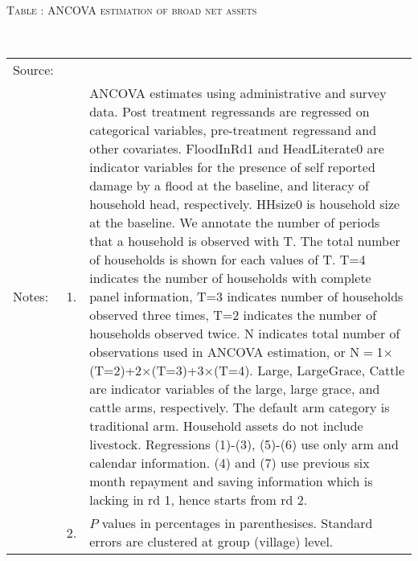 \hspace{-1cm}\begin{minipage}[t]{14cm}
\hfil\textsc{\normalsize Table \thetable: ANCOVA estimation of broad net assets\label{tab ANCOVA net assets}}\\
\setlength{\tabcolsep}{1pt}
\setlength{\baselineskip}{8pt}
\renewcommand{\arraystretch}{.55}
\hfil{}\\
\renewcommand{\arraystretch}{.8}
\setlength{\tabcolsep}{1pt}
\begin{tabular}{>{\hfill\scriptsize}p{1cm}<{}>{\hfill\scriptsize}p{.25cm}<{}>{\scriptsize}p{12cm}<{\hfill}}
Source:& \multicolumn{2}{l}{\scriptsize Estimated with GUK administrative and survey data.}\\
Notes: & 1. & ANCOVA estimates using administrative and survey data. Post treatment regressands are regressed on categorical variables, pre-treatment regressand and other covariates. \textsf{FloodInRd1} and \textsf{HeadLiterate0} are indicator variables for the presence of self reported damage by a flood at the baseline, and literacy of household head, respectively. \textsf{HHsize0} is household size at the baseline. We annotate the number of periods that a household is observed with \textsf{T}. The total number of households is shown for each values of \textsf{T}. \textsf{T=4} indicates the number of households with complete panel information, \textsf{T=3} indicates number of households observed three times, \textsf{T=2} indicates the number of households observed twice. \textsf{N} indicates total number of observations used in ANCOVA estimation, or \textsf{N$=$1$\times$(T=2)+2$\times$(T=3)+3$\times$(T=4)}.  \textsf{Large}, \textsf{LargeGrace}, \textsf{Cattle} are indicator variables of the \textsf{large}, \textsf{large grace}, and \textsf{cattle} arms, respectively. The default arm category is \textsf{traditional} arm. Household assets do not include livestock. Regressions (1)-(3), (5)-(6) use only arm and calendar information. (4) and (7) use previous six month repayment and saving information which is lacking in rd 1, hence starts from rd 2.\\
& 2. & $P$ values in percentages in parenthesises. Standard errors are clustered at group (village) level.
\end{tabular}
\end{minipage}

